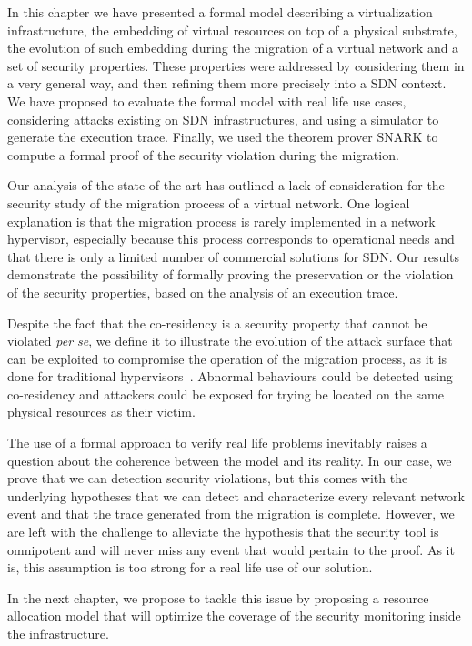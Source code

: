     In this chapter we have presented a formal model describing a virtualization infrastructure, the embedding of virtual resources on top of a physical substrate, the evolution of such embedding during the migration of a virtual network and a set of security properties. These properties were addressed by considering them in a very general way, and then refining them more precisely into a SDN context. We have proposed to evaluate the formal model with real life use cases, considering attacks existing on SDN infrastructures, and using a simulator to generate the execution trace. Finally, we used the theorem prover SNARK to compute a formal proof of the security violation during the migration.

Our analysis of the state of the art has outlined a lack of consideration for the security study of the migration process of a virtual network.
One logical explanation is that the migration process is rarely implemented in a network hypervisor, especially because this process corresponds to operational needs and that there is only a limited number of commercial solutions for SDN.
Our results demonstrate the possibility of formally proving the preservation or the violation of the security properties, based on the analysis of an execution trace.

Despite the fact that the co-residency is a security property that cannot be violated \textit{per se}, we define it to illustrate the evolution of the attack surface that can be exploited to compromise the operation of the migration process, as it is done for traditional hypervisors~\cite{stalling-atya2017,malicious-atya2017}.
Abnormal behaviours could be detected using co-residency and attackers could be exposed for trying be located on the same physical resources as their victim. 

The use of a formal approach to verify real life problems inevitably raises a question about the coherence between the model and its reality.
In our case, we prove that we can detection security violations, but this comes with the underlying hypotheses that we can detect and characterize every relevant network event and that the trace generated from the migration is complete. However, we are left with the challenge to alleviate the hypothesis that the security tool is omnipotent and will never miss any event that would pertain to the proof. As it is, this assumption is too strong for a real life use of our solution.

In the next chapter, we propose to tackle this issue by proposing a resource allocation model that will optimize the coverage of the security monitoring inside the infrastructure.